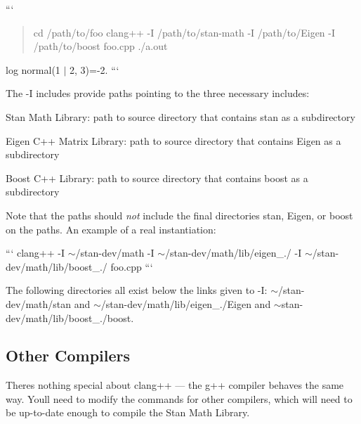 ``` \begin{quote}
cd /path/to/foo clang++ -\/\+I /path/to/stan-\/math -\/\+I /path/to/\+Eigen -\/\+I /path/to/boost foo.\+cpp ./a.out \end{quote}
log normal(1 $\vert$ 2, 3)=-\/2. ```

The {\ttfamily -\/\+I} includes provide paths pointing to the three necessary includes\+:


\begin{DoxyItemize}
\item Stan Math Library\+: path to source directory that contains {\ttfamily stan} as a subdirectory
\item Eigen C++ Matrix Library\+: path to source directory that contains {\ttfamily Eigen} as a subdirectory
\item Boost C++ Library\+: path to source directory that contains {\ttfamily boost} as a subdirectory
\end{DoxyItemize}

Note that the paths should {\itshape not} include the final directories {\ttfamily stan}, {\ttfamily Eigen}, or {\ttfamily boost} on the paths. An example of a real instantiation\+:

``` clang++ -\/\+I $\sim$/stan-\/dev/math -\/\+I $\sim$/stan-\/dev/math/lib/eigen\+\_./ -\/\+I $\sim$/stan-\/dev/math/lib/boost\+\_./ foo.\+cpp ```

The following directories all exist below the links given to {\ttfamily -\/\+I}\+: {\ttfamily $\sim$/stan-\/dev/math/stan} and {\ttfamily $\sim$/stan-\/dev/math/lib/eigen\+\_./\+Eigen} and {\ttfamily $\sim$stan-\/dev/math/lib/boost\+\_./boost}.

\subsection*{Other Compilers }

There\textquotesingle{}s nothing special about {\ttfamily clang++} --- the {\ttfamily g++} compiler behaves the same way. You\textquotesingle{}ll need to modify the commands for other compilers, which will need to be up-\/to-\/date enough to compile the Stan Math Library. 